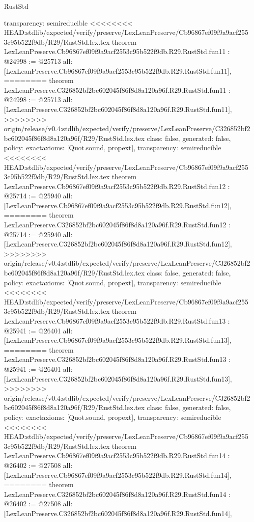 \begin{lexlean}{RustStd}
\begin{coremodule}
{\begin{coremodule}
{{{{{{{{{{{{{{  transparency: semireducible
}
<<<<<<<< HEAD:stdlib/expected/verify/preserve/LexLeanPreserve/Cb96867ef09f9a9acf2553c95b522f9db/R29/RustStd.lex.tex
theorem LexLeanPreserve.Cb96867ef09f9a9acf2553c95b522f9db.R29.RustStd.fun11 : @24998 := @25713 {
  all: [LexLeanPreserve.Cb96867ef09f9a9acf2553c95b522f9db.R29.RustStd.fun11],
========
theorem LexLeanPreserve.C326852bf2bc602045f86f8d8a120a96f.R29.RustStd.fun11 : @24998 := @25713 {
  all: [LexLeanPreserve.C326852bf2bc602045f86f8d8a120a96f.R29.RustStd.fun11],
>>>>>>>> origin/release/v0.4:stdlib/expected/verify/preserve/LexLeanPreserve/C326852bf2bc602045f86f8d8a120a96f/R29/RustStd.lex.tex
  class: false,
  generated: false,
  policy: exact{axioms: [Quot.sound, propext]},
  transparency: semireducible
}
<<<<<<<< HEAD:stdlib/expected/verify/preserve/LexLeanPreserve/Cb96867ef09f9a9acf2553c95b522f9db/R29/RustStd.lex.tex
theorem LexLeanPreserve.Cb96867ef09f9a9acf2553c95b522f9db.R29.RustStd.fun12 : @25714 := @25940 {
  all: [LexLeanPreserve.Cb96867ef09f9a9acf2553c95b522f9db.R29.RustStd.fun12],
========
theorem LexLeanPreserve.C326852bf2bc602045f86f8d8a120a96f.R29.RustStd.fun12 : @25714 := @25940 {
  all: [LexLeanPreserve.C326852bf2bc602045f86f8d8a120a96f.R29.RustStd.fun12],
>>>>>>>> origin/release/v0.4:stdlib/expected/verify/preserve/LexLeanPreserve/C326852bf2bc602045f86f8d8a120a96f/R29/RustStd.lex.tex
  class: false,
  generated: false,
  policy: exact{axioms: [Quot.sound, propext]},
  transparency: semireducible
}
<<<<<<<< HEAD:stdlib/expected/verify/preserve/LexLeanPreserve/Cb96867ef09f9a9acf2553c95b522f9db/R29/RustStd.lex.tex
theorem LexLeanPreserve.Cb96867ef09f9a9acf2553c95b522f9db.R29.RustStd.fun13 : @25941 := @26401 {
  all: [LexLeanPreserve.Cb96867ef09f9a9acf2553c95b522f9db.R29.RustStd.fun13],
========
theorem LexLeanPreserve.C326852bf2bc602045f86f8d8a120a96f.R29.RustStd.fun13 : @25941 := @26401 {
  all: [LexLeanPreserve.C326852bf2bc602045f86f8d8a120a96f.R29.RustStd.fun13],
>>>>>>>> origin/release/v0.4:stdlib/expected/verify/preserve/LexLeanPreserve/C326852bf2bc602045f86f8d8a120a96f/R29/RustStd.lex.tex
  class: false,
  generated: false,
  policy: exact{axioms: [Quot.sound, propext]},
  transparency: semireducible
}
<<<<<<<< HEAD:stdlib/expected/verify/preserve/LexLeanPreserve/Cb96867ef09f9a9acf2553c95b522f9db/R29/RustStd.lex.tex
theorem LexLeanPreserve.Cb96867ef09f9a9acf2553c95b522f9db.R29.RustStd.fun14 : @26402 := @27508 {
  all: [LexLeanPreserve.Cb96867ef09f9a9acf2553c95b522f9db.R29.RustStd.fun14],
========
theorem LexLeanPreserve.C326852bf2bc602045f86f8d8a120a96f.R29.RustStd.fun14 : @26402 := @27508 {
  all: [LexLeanPreserve.C326852bf2bc602045f86f8d8a120a96f.R29.RustStd.fun14],
}}}}}}}}}}}}}}}}}}
\end{coremodule}}
\end{coremodule}
\end{lexlean}
